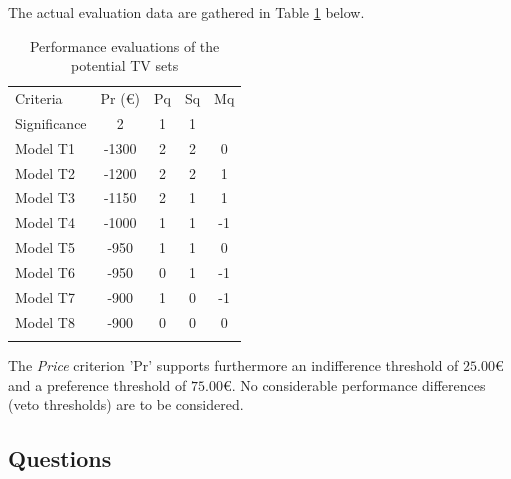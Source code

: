 The actual evaluation data are gathered in Table \ref{tab:15.2} below.    

\begin{table}[h]
\caption{Performance evaluations of the potential TV sets}
\label{tab:15.2}       %
\begin{center}
    \begin{tabular}{l|c|c|c|c}
      \hline\noalign{\smallskip}
      Criteria & Pr (€) & Pq & Sq & Mq \\
      Significance & 2  & 1  & 1  & \\
      \noalign{\smallskip}\hline\noalign{\smallskip}
      Model T1   &     -1300  &  2  &  2  &   0\\
      Model T2   &     -1200  &  2  &  2  &   1\\
      Model T3   &     -1150  &  2  &  1  &   1\\
      Model T4   &     -1000  &  1  &  1  &  -1\\
      Model T5   &     -950   &  1  &  1  &   0\\
      Model T6   &     -950   &  0  &  1  &  -1\\
      Model T7   &     -900   &  1  &  0  &  -1\\
      Model T8   &     -900   &  0  &  0  &   0\\
      \noalign{\smallskip}\hline
    \end{tabular}
\end{center}
\end{table}

The \emph{Price} criterion 'Pr' supports furthermore an indifference threshold of $25.00$€ and a preference threshold of $75.00$€. No considerable performance differences (veto thresholds) are to be considered.

\subsection{Questions}
\label{sec:15.3.2}

